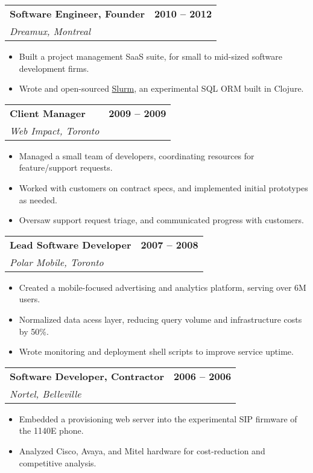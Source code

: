 \documentclass[12pt]{article}
\makeatletter
\newenvironment{justifycolumns}
{\begin{tabular*}{\textwidth}{@{\extracolsep{\fill}}lr@{}}}
{\end{tabular*}}
\newcommand{\row}[2]{#1 & #2 \\}
\newcommand{\rowheading}[2]{\row{\textbf{#1}}{\textbf{#2}}}
\newcommand{\range}[2]{#1 -- #2}
\newcommand{\blockseparation}{\vspace{0.13in}}
\newenvironment{tightbullets}
{\begin{itemize}}
{\end{itemize}}
\newenvironment{bullets}
{\begin{tightbullets}}
{\end{tightbullets} \blockseparation}
\makeatother
\begin{document}
\begin{flushleft}
\pagebreak

\begin{justifycolumns}
	\rowheading{Software Engineer, Founder}{\range{2010}{2012}}
	\row{\emph{Dreamux, Montreal}}{}
\end{justifycolumns}
\begin{bullets}
	\item Built a project management SaaS suite, for small to mid-sized software development firms.
	\item Wrote and open-sourced \href{https://github.com/amcnamara/slurm}{Slurm}, an experimental SQL ORM built in Clojure.
\end{bullets}

\begin{justifycolumns}
	\rowheading{Client Manager}{\range{2009}{2009}}
	\row{\emph{Web Impact, Toronto}}{}
\end{justifycolumns}
\begin{bullets}
	\item Managed a small team of developers, coordinating resources for feature/support requests.
	\item Worked with customers on contract specs, and implemented initial prototypes as needed.
	\item Oversaw support request triage, and communicated progress with customers.
\end{bullets}

\begin{justifycolumns}
	\rowheading{Lead Software Developer}{\range{2007}{2008}}
	\row{\emph{Polar Mobile, Toronto}}{}
\end{justifycolumns}
\begin{bullets}
	\item Created a mobile-focused advertising and analytics platform, serving over 6M users.
	\item Normalized data acess layer, reducing query volume and infrastructure costs by 50\%.
	\item Wrote monitoring and deployment shell scripts to improve service uptime.
\end{bullets}

\begin{justifycolumns}
	\rowheading{Software Developer, Contractor}{\range{2006}{2006}}
	\row{\emph{Nortel, Belleville}}{}
\end{justifycolumns}
\begin{bullets}
	\item Embedded a provisioning web server into the experimental SIP firmware of the 1140E phone.
	\item Analyzed Cisco, Avaya, and Mitel hardware for cost-reduction and competitive analysis.
\end{bullets}

\blockseparation



\end{flushleft}
\end{document}
